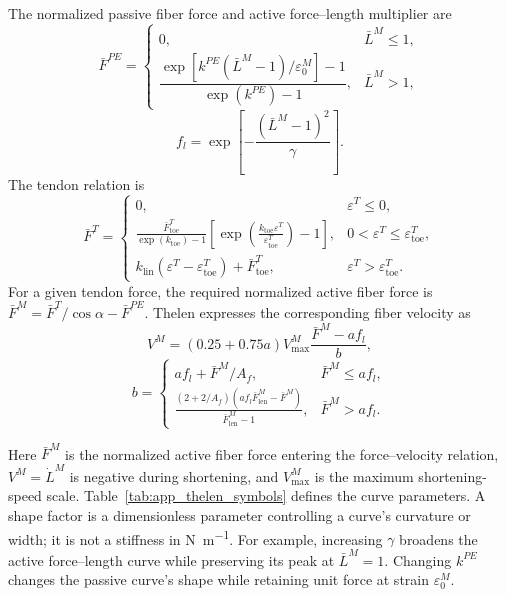 The normalized passive fiber force and active force--length multiplier are
\begin{equation}
 \bar F^{PE}=\begin{cases}
 0,&\bar L^M\leq1,\\[2pt]
 \dfrac{\exp\!\left[k^{PE}(\bar L^M-1)/\varepsilon_0^M\right]-1}
 {\exp(k^{PE})-1},&\bar L^M>1,
 \end{cases}
 \label{eq:app_thelen3}
\end{equation}
\begin{equation}
 f_l=\exp\!\left[-\frac{(\bar L^M-1)^2}{\gamma}\right].
 \label{eq:app_thelen4}
\end{equation}
The tendon relation is
\begin{equation}
 \bar F^T=\begin{cases}
 0,&\varepsilon^T\leq0,\\[2pt]
 \displaystyle\frac{\bar F^T_{\mathrm{toe}}}{\exp(k_{\mathrm{toe}})-1}
 \left[\exp\!\left(\frac{k_{\mathrm{toe}}\varepsilon^T}{\varepsilon^T_{\mathrm{toe}}}\right)-1\right],
 &0<\varepsilon^T\leq\varepsilon^T_{\mathrm{toe}},\\[6pt]
 k_{\mathrm{lin}}(\varepsilon^T-\varepsilon^T_{\mathrm{toe}})+\bar F^T_{\mathrm{toe}},
 &\varepsilon^T>\varepsilon^T_{\mathrm{toe}}.
 \end{cases}
 \label{eq:app_thelen5}
\end{equation}
For a given tendon force, the required normalized active fiber force is $\bar F^M=\bar F^T/\cos\alpha-\bar F^{PE}$. Thelen expresses the corresponding fiber velocity as
\begin{equation}
 V^M=(0.25+0.75a)V^M_{\max}\frac{\bar F^M-a f_l}{b},
 \label{eq:app_thelen6}
\end{equation}
\begin{equation}
 b=\begin{cases}
 a f_l+\bar F^M/A_f,&\bar F^M\leq a f_l,\\[4pt]
 \displaystyle\frac{(2+2/A_f)(a f_l\bar F^M_{\mathrm{len}}-\bar F^M)}
 {\bar F^M_{\mathrm{len}}-1},&\bar F^M>a f_l.
 \end{cases}
 \label{eq:app_thelen7}
\end{equation}

Here $\bar F^M$ is the normalized active fiber force entering the force--velocity relation, $V^M=\dot L^M$ is negative during shortening, and $V^M_{\max}$ is the maximum shortening-speed scale. Table~\ref{tab:app_thelen_symbols} defines the curve parameters. A shape factor is a dimensionless parameter controlling a curve's curvature or width; it is not a stiffness in \unit{\newton\per\meter}. For example, increasing $\gamma$ broadens the active force--length curve while preserving its peak at $\bar L^M=1$. Changing $k^{PE}$ changes the passive curve's shape while retaining unit force at strain $\varepsilon_0^M$.

